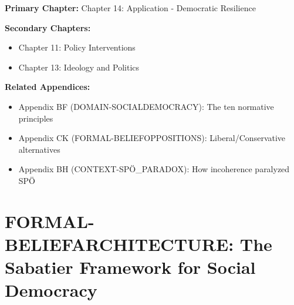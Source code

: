 %
%

\begin{tcolorbox}[colback=purple!5!white, colframe=purple!75!black,
    title=Chapter Linkage]

\textbf{Primary Chapter:} Chapter 14: Application - Democratic Resilience

\textbf{Secondary Chapters:}
\begin{itemize}[nosep]
\item Chapter 11: Policy Interventions
\item Chapter 13: Ideology and Politics
\end{itemize}

\textbf{Related Appendices:}
\begin{itemize}[nosep]
\item Appendix BF (DOMAIN-SOCIALDEMOCRACY): The ten normative principles
\item Appendix CK (FORMAL-BELIEFOPPOSITIONS): Liberal/Conservative alternatives
\item Appendix BH (CONTEXT-SPÖ_PARADOX): How incoherence paralyzed SPÖ
\end{itemize}

\end{tcolorbox}


\chapter{FORMAL-BELIEFARCHITECTURE: The Sabatier Framework for Social Democracy}
\label{app:cj-beliefarchitecture}


